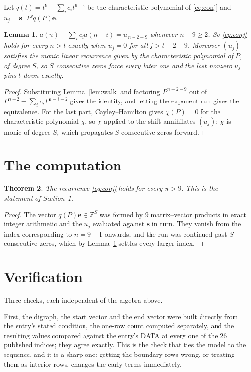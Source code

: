 \documentclass[11pt,a4paper]{article}
\theoremstyle{plain}
\newtheorem{theorem}{Theorem}
\newtheorem{lemma}[theorem]{Lemma}
\theoremstyle{definition}
\begin{document}
Let $q(t)=t^{9}-\sum_i c_i t^{9-i}$ be the characteristic polynomial of
\eqref{eq:conj} and $u_j=\mathbf{s}^{\!\top}P^{j}q(P)\mathbf{e}$.

\begin{lemma}\label{lem:crit}
$a(n)-\sum_i c_i a(n-i)=u_{\,n-2-9}$ whenever $n-9\ge2$. So \eqref{eq:conj}
holds for every $n>t$ exactly when $u_j=0$ for all $j>t-2-9$. Moreover $(u_j)$
satisfies the monic linear recurrence given by the characteristic polynomial of $P$, of
degree $S$, so $S$ consecutive zeros force every later one and the last nonzero $u_j$ pins
$t$ down exactly.
\end{lemma}

\begin{proof}
Substituting Lemma~\ref{lem:walk} and factoring $P^{\,n-2-9}$ out of
$P^{n-2}-\sum_i c_i P^{n-i-2}$ gives the identity, and letting the exponent run gives the
equivalence. For the last part, Cayley--Hamilton gives $\chi(P)=0$ for the characteristic
polynomial $\chi$, so $\chi$ applied to the shift annihilates $(u_j)$; $\chi$ is monic of
degree $S$, which propagates $S$ consecutive zeros forward.
\end{proof}

\section{The computation}

\begin{theorem}
The recurrence \eqref{eq:conj} holds for every $n>9$. This is the statement of
Section~1.
\end{theorem}

\begin{proof}
The vector $q(P)\mathbf{e}\in\mathbb{Z}^{S}$ was formed by $9$ matrix--vector
products in exact integer arithmetic and the $u_j$ evaluated against $\mathbf{s}$ in turn.
They vanish from the index corresponding to $n=9+1$ onwards, and the run was continued
past $S$ consecutive zeros, which by Lemma~\ref{lem:crit} settles every larger index.
\end{proof}

\section{Verification}

Three checks, each independent of the algebra above.

First, the digraph, the start vector and the end vector were built directly from the
entry's stated condition, the one-row count computed separately, and the resulting values
compared against the entry's DATA at every one of the $26$ published indices; they
agree exactly. This is the check that ties the model to the sequence, and it is a sharp one:
getting the boundary rows wrong, or treating them as interior rows, changes the early terms
immediately.
\end{document}
